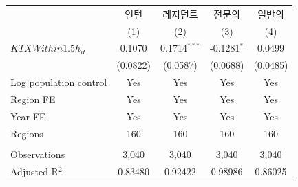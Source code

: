 \begingroup
\centering
\begin{tabular}{lcccc}
   \toprule
                          & 인턴     & 레지던트       & 전문의        & 일반의 \\   
                          & (1)      & (2)            & (3)           & (4)\\  
   \midrule 
   $KTXWithin1.5h_{it}$   & 0.1070   & 0.1714$^{***}$ & -0.1281$^{*}$ & 0.0499\\   
                          & (0.0822) & (0.0587)       & (0.0688)      & (0.0485)\\   
   Log population control & Yes      & Yes            & Yes           & Yes\\  
   Region FE              & Yes      & Yes            & Yes           & Yes\\  
   Year FE                & Yes      & Yes            & Yes           & Yes\\  
   Regions                & 160      & 160            & 160           & 160\\  
    \\
   Observations           & 3,040    & 3,040          & 3,040         & 3,040\\  
   Adjusted R$^2$         & 0.83480  & 0.92422        & 0.98986       & 0.86025\\  
   \bottomrule
\end{tabular}
\par\endgroup
